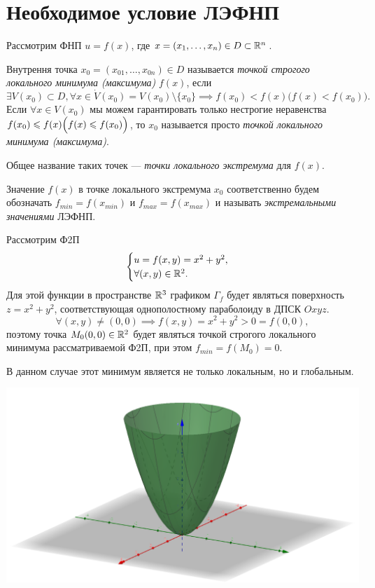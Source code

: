 \documentclass[../../main.tex]{subfiles}
\begin{document}
	\section{Необходимое условие ЛЭФНП}
	Рассмотрим ФНП $u = f (x)$,
	где $x = (x_1, \ldots, x_n) \in D \subset \mathbb{R}^n$.
	
	Внутрення точка $x_0 = (x_{0 1}, \ldots, x_{0n}) \in D$
	называется \emph{точкой строгого локального минимума (максимума)}
	$f(x)$,
	если
	\[
		\exists V (x_0) \subset D,
		\forall x \in \dot{V} (x_0)
		= V (x_0) \setminus \{x_0\}
		\implies f (x_0) < f (x)
		\Big(f (x) < f (x_0)\Big).
	\]
	Если $\forall x \in V (x_0)$ мы можем гарантировать
	только нестрогие неравенства $f (x_0) \leqslant f (x)
	\\ \displaystyle
	\Big(f (x) \leqslant f (x_0)\Big)$,
	то $x_0$ называется просто \emph{точкой локального минимума (максимума)}.
	
	Общее название таких точек
	--- \emph{точки локального экстремума} для $f (x)$.
	
	Значение $f (x)$ в точке локального экстремума $x_0$
	соответственно будем обозначать
	$f_{min} = f (x_{min})$ и $f_{max} = f (x_{max})$
	и называть \emph{экстремальными значениями} ЛЭФНП.
	
	\begin{exmp}
		Рассмотрим Ф2П
		\[
		\begin{cases}
			u = f (x, y) = x^2 + y^2, \\
			\forall (x, y) \in \mathbb{R}^2. \\
		\end{cases}
		\]
		Для этой функции в пространстве $\mathbb{R}^3$ графиком $\Gamma_f$
		будет являться поверхность $z = x^2 + y^2$,
		соответствующая однополостному параболоиду в ДПСК $Oxyz$.
		\[
			\forall (x, y) \ne (0, 0)
			\implies
			f (x, y) = x^2 + y^2 > 0 = f (0, 0),
		\]
		поэтому точка $M_0 (0, 0) \in \mathbb{R}^2$
		будет являться точкой строгого локального минимума рассматриваемой Ф2П,
		при этом $f_{min} = f (M_0) = 0$.
		
		В данном случае
		этот минимум является не только локальным, но и глобальным.
		
		\includegraphics[width=0.9\linewidth]{Ellyptic_paraboloid}
		
	\end{exmp}
	
\end{document}
